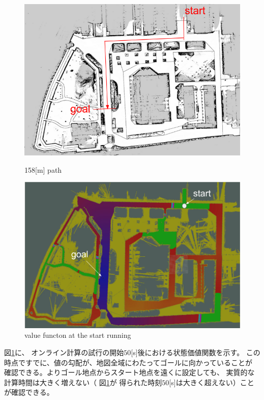 \documentclass{jarticle}
\begin{document}
\begin{figure}[bt]
  \centering
   \includegraphics[width=1.0\linewidth]{./figs/tsudanuma-long.png}
	\caption{158[m] path}
	\label{fig:tsudanuma-long-path}
	\vspace{1em}
  \centering
	\includegraphics[width=1.0\linewidth]{./figs/raspicat-value-function.png}
   \caption{value functon at the start running}
	\label{fig:raspicat-value-function}
\end{figure}

図\ref{fig:raspicat-value-function}に、
オンライン計算の試行の開始$50$[s]後における状態価値関数を示す。
この時点ですでに、値の勾配が、地図全域にわたってゴールに向かっていることが
確認できる。よりゴール地点からスタート地点を遠くに設定しても、
実質的な計算時間は大きく増えない（
図\ref{fig:raspicat-value-function}が
得られた時刻$50$[s]は大きく超えない）ことが確認できる。
\end{document}
